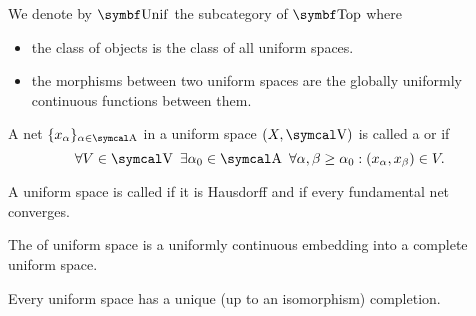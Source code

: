 \begin{definition}\label{def:category_of_uniform_spaces}
  We denote by \( \Cat{Unif} \) the subcategory of \( \Bold{Top} \) where
  \begin{itemize}
    \item the class of objects is the class of all uniform spaces.
    \item the morphisms between two uniform spaces are the globally uniformly continuous functions between them.
  \end{itemize}
\end{definition}

\begin{definition}\label{def:fundamental_net}
  A net \( \{ x_\al \}_{\al \in \CA} \) in a uniform space \( (X, \CV) \) is called a  or  if
  \begin{equation*}
    \forall V \in \CV \ \exists \al_0 \in \CA \ \forall \al, \beta \geq \al_0 : (x_\al, x_\beta) \in V.
  \end{equation*}
\end{definition}

\begin{definition}\label{def:complete_uniform_space}\cite[446]{Engelking1989}
  A uniform space is called  if it is Hausdorff and if every fundamental net converges.

  The  of uniform space is a uniformly continuous embedding into a complete uniform space.
\end{definition}

\begin{theorem}\label{thm:uniform_space_completion_existence}\cite[theorem 8.3.12]{Engelking1989}
  Every uniform space has a unique (up to an isomorphism) completion.
\end{theorem}
